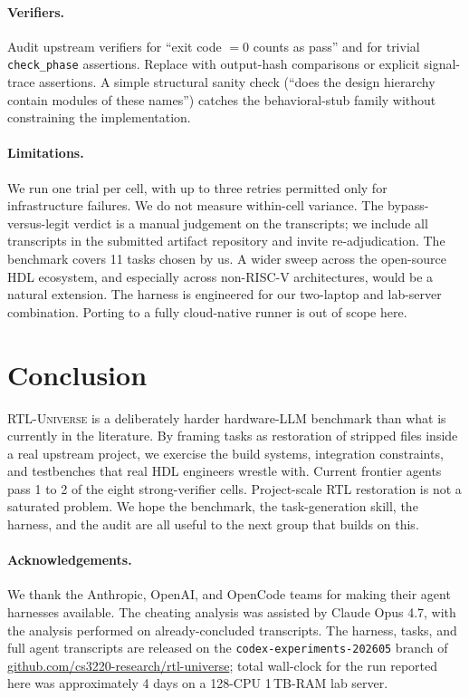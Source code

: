 \documentclass{article}
\begin{document}
\paragraph{Verifiers.} Audit upstream verifiers for ``exit code $=0$ counts as pass'' and for
trivial \texttt{check\_phase} assertions. Replace with output-hash comparisons or explicit
signal-trace assertions. A simple structural sanity check (``does the design hierarchy
contain modules of these names'') catches the behavioral-stub family without constraining the
implementation.

\paragraph{Limitations.} We run one trial per cell, with up to three retries permitted only
for infrastructure failures. We do not measure within-cell variance. The bypass-versus-legit
verdict is a manual judgement on the transcripts; we include all transcripts in the
submitted artifact repository and invite re-adjudication. The benchmark covers 11 tasks
chosen by us. A wider sweep across the open-source HDL ecosystem, and especially across
non-RISC-V architectures, would be a natural extension. The harness is engineered for our
two-laptop and lab-server combination. Porting to a fully cloud-native runner is out of
scope here.

\section{Conclusion}

\textsc{RTL-Universe} is a deliberately harder hardware-LLM benchmark than what is currently
in the literature. By framing tasks as restoration of stripped files inside a real upstream
project, we exercise the build systems, integration constraints, and testbenches that real
HDL engineers wrestle with. Current frontier agents pass 1 to 2 of the eight strong-verifier
cells. Project-scale RTL restoration is not a saturated problem. We hope the benchmark, the
task-generation skill, the harness, and the audit are all useful to the next group that
builds on this.

\paragraph{Acknowledgements.}
We thank the Anthropic, OpenAI, and OpenCode teams for making their agent harnesses
available. The cheating analysis was assisted by Claude Opus 4.7, with the analysis performed
on already-concluded transcripts. The harness, tasks, and full agent transcripts are
released on the \texttt{codex-experiments-202605} branch of
\url{github.com/cs3220-research/rtl-universe}; total wall-clock for the run reported here
was approximately 4 days on a 128-CPU 1\,TB-RAM lab server.

\renewcommand{\bibfont}{\small}
\setlength{\bibsep}{2pt plus 0.5ex}

\end{document}
